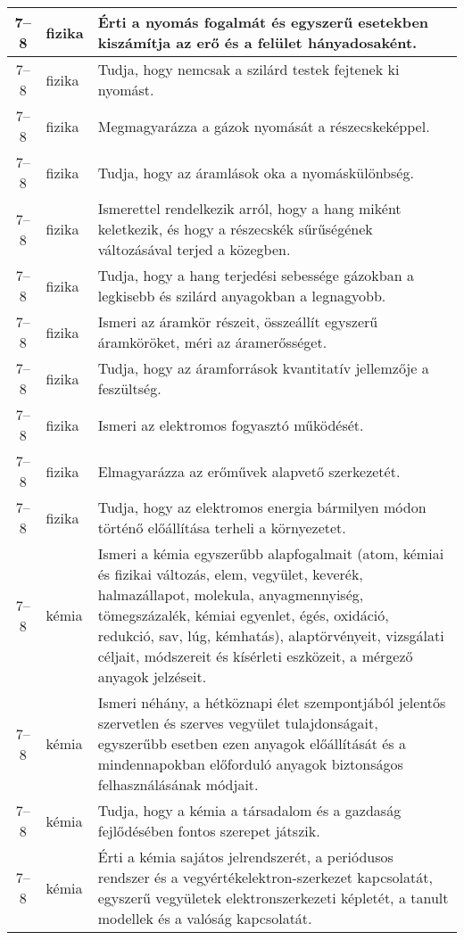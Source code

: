 \begin{small}
\begin{longtable}{c | p{2cm} |  p{11cm} }
              7--8 & fizika & Érti a nyomás fogalmát és egyszerű esetekben kiszámítja az erő és a felület hányadosaként. \\ \hline
              7--8 & fizika & Tudja, hogy nemcsak a szilárd testek fejtenek ki nyomást. \\ \hline
              7--8 & fizika & Megmagyarázza a gázok nyomását a részecskeképpel. \\ \hline
              7--8 & fizika & Tudja, hogy az áramlások oka a nyomáskülönbség. \\ \hline
              7--8 & fizika & Ismerettel rendelkezik arról, hogy a hang miként keletkezik, és hogy a részecskék sűrűségének változásával terjed a közegben. \\ \hline
              7--8 & fizika & Tudja, hogy a hang terjedési sebessége gázokban a legkisebb és szilárd anyagokban a legnagyobb. \\ \hline
              7--8 & fizika & Ismeri az áramkör részeit, összeállít egyszerű áramköröket, méri az áramerősséget. \\ \hline
              7--8 & fizika & Tudja, hogy az áramforrások kvantitatív jellemzője a feszültség. \\ \hline
              7--8 & fizika & Ismeri az elektromos fogyasztó működését. \\ \hline
              7--8 & fizika & Elmagyarázza az erőművek alapvető szerkezetét. \\ \hline
              7--8 & fizika & Tudja, hogy az elektromos energia bármilyen módon történő előállítása terheli a környezetet. \\ \hline
              7--8 & kémia & Ismeri a kémia egyszerűbb alapfogalmait (atom, kémiai és fizikai változás, elem, vegyület, keverék, halmazállapot, molekula, anyagmennyiség, tömegszázalék, kémiai egyenlet, égés, oxidáció, redukció, sav, lúg, kémhatás), alaptörvényeit, vizsgálati céljait, módszereit és kísérleti eszközeit, a mérgező anyagok jelzéseit. \\ \hline
              7--8 & kémia & Ismeri néhány, a hétköznapi élet szempontjából jelentős szervetlen és szerves vegyület tulajdonságait, egyszerűbb esetben ezen anyagok előállítását és a mindennapokban előforduló anyagok biztonságos felhasználásának módjait. \\ \hline
              7--8 & kémia & Tudja, hogy a kémia a társadalom és a gazdaság fejlődésében fontos szerepet játszik. \\ \hline
              7--8 & kémia & Érti a kémia sajátos jelrendszerét, a periódusos rendszer és a vegyértékelektron-szerkezet kapcsolatát, egyszerű vegyületek elektronszerkezeti képletét, a tanult modellek és a valóság kapcsolatát. \\ \hline

\end{longtable}
\end{small}
